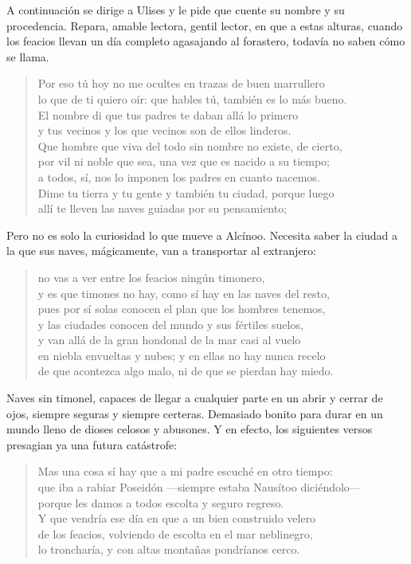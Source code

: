 A continuación se dirige a Ulises y le pide que cuente su nombre y su procedencia. Repara, amable lectora, gentil lector, en que a estas alturas, cuando los feacios llevan un día completo agasajando al forastero, todavía no saben cómo se llama.

\begin{verse}
Por eso tú hoy no me ocultes en trazas de buen marrullero\\
lo que de ti quiero oír: que hables tú, también es lo más bueno.\\
El nombre di que tus padres te daban allá lo primero\\
y tus vecinos y los que vecinos son de ellos linderos.\\
Que hombre que viva del todo sin nombre no existe, de cierto,\\
por vil ni noble que sea, una vez que es nacido a su tiempo;\\
a todos, sí, nos lo imponen los padres en cuanto nacemos.\\
Dime tu tierra y tu gente y también tu ciudad, porque luego\\
allí te lleven las naves guiadas por su pensamiento;
\end{verse}

Pero no es solo la curiosidad lo que mueve a Alcínoo. Necesita saber la ciudad a la que sus naves, mágicamente, van a transportar al extranjero:

\begin{verse}
no vas a ver entre los feacios ningún timonero,\\
y es que timones no hay, como sí hay en las naves del resto,\\
pues por sí solas conocen el plan que los hombres tenemos,\\
y las ciudades conocen del mundo y sus fértiles suelos,\\
y van allá de la gran hondonal de la mar casi al vuelo\\
en niebla envueltas y nubes; y en ellas no hay nunca recelo\\
de que acontezca algo malo, ni de que se pierdan hay miedo.
\end{verse}

Naves sin timonel, capaces de llegar a cualquier parte en un abrir y cerrar de ojos, siempre seguras y siempre certeras. Demasiado bonito para durar en un mundo lleno de dioses celosos y abusones. Y en efecto, los siguientes versos presagian ya una futura catástrofe:

\begin{verse}
Mas una cosa sí hay que a mi padre escuché en otro tiempo:\\
que iba a rabiar Poseidón ---siempre estaba Nausítoo diciéndolo---\\
porque les damos a todos escolta y seguro regreso.\\
Y que vendría ese día en que a un bien construido velero\\
de los feacios, volviendo de escolta en el mar neblinegro,\\
lo troncharía, y con altas montañas pondríanos cerco.
\end{verse}

